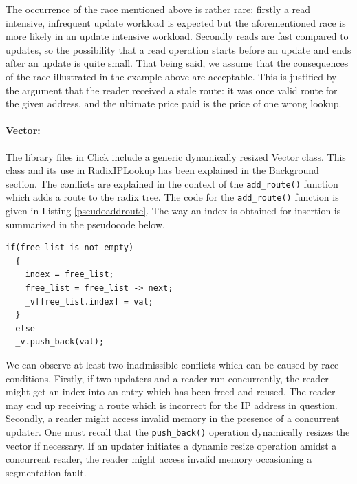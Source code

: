 \documentclass[12pt,a4paper]{article}
\begin{document}
The occurrence of the race mentioned above is rather rare: firstly a read intensive, infrequent update workload is expected but the aforementioned race is more likely in an update intensive workload. Secondly reads are fast compared to updates, so the possibility that a read operation starts before an update and ends after an update is quite small. That being said, we assume that the consequences of the race illustrated in the example above are acceptable. This is justified by the argument that the reader received a stale route: it was once valid route for the given address, and the ultimate price paid is the price of one wrong lookup.
\paragraph{Vector:}
The library files in Click include a generic dynamically resized Vector class. This class and its use in RadixIPLookup has been explained in the Background section. The conflicts are explained in the context of the \verb+add_route()+ function which adds a route to the radix tree. The code for the \verb+add_route()+ function is given in Listing \ref{pseudoaddroute}. The way an index is obtained for insertion is summarized in the pseudocode below. 
\begin{lstlisting}[caption = Pseudocode for acquiring an index in add\_route, label=pseudoaddroute]
  if(free_list is not empty)
  {
    index = free_list;
    free_list = free_list -> next;
    _v[free_list.index] = val;
  }
  else 
  _v.push_back(val);
\end{lstlisting}
We can observe at least two inadmissible conflicts which can be caused by race conditions. Firstly, if two updaters and a reader run concurrently, the reader might get an index into an entry which has been freed and reused. The reader may end up receiving a route which is incorrect for the IP address in question. Secondly, a reader might access invalid memory in the presence of a concurrent updater. One must recall that the \verb+push_back()+ operation dynamically resizes the vector if necessary. If an updater initiates a dynamic resize operation amidst a concurrent reader, the reader might access invalid memory occasioning a segmentation fault.
\end{document}
